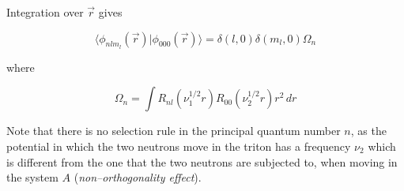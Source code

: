 \begin{subappendices}
Integration over $\vec r$ gives

\begin{equation}\label{5lec12}
\langle \phi_{n l m_l}(\vec r) | \phi_{000}(\vec r) \rangle = \delta(l,0) \delta(m_l,0) \Omega_n
\end{equation}

where


\begin{equation}\label{5lec13}
\Omega_n=\int R_{n l} (\nu_1^{1/2} r)R_{00} (\nu_2^{1/2} r) r^2\, dr
\end{equation}


Note that there is no selection rule in the principal quantum number $n$, as the potential in which the two neutrons move in the triton has a frequency $\nu_2$ which is different from the one that the two neutrons are subjected to, when moving in the system $A$ (\textit{non--orthogonality effect}).



\end{subappendices}
